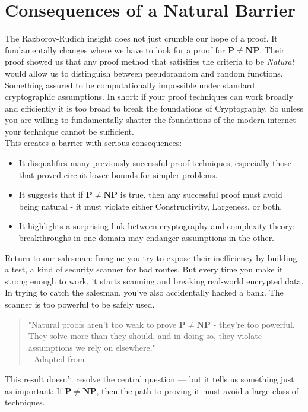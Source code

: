 \documentclass[12pt]{report}
\begin{document}
\section{Consequences of a Natural Barrier}
The Razborov-Rudich insight does not just crumble our hope of a proof.
It fundamentally changes where we have to look for a proof for $\mathbf{P \ne NP}$.
Their proof showed us that any proof method that satisifies the criteria to be \textit{Natural} would allow us to distinguish between pseudorandom and random functions.
Something assured to be computationally impossible under standard cryptographic assumptions.
In short: if your proof techniques can work broadly and efficiently it is too broad to break the foundations of Cryptography.
So unless you are willing to fundamentally shatter the foundations of the modern internet your technique cannot be sufficient.\\
This creates a barrier with serious consequences:
\begin{itemize}
    \item It disqualifies many previously successful proof techniques, especially those that proved circuit lower bounds for simpler problems.
    \item It suggests that if $\mathbf{P \ne NP}$ is true, then any successful proof must avoid being natural - it must violate either Constructivity, Largeness, or both.
    \item It highlights a surprising link between cryptography and complexity theory: breakthroughs in one domain may endanger assumptions in the other.
\end{itemize}
Return to our salesman:
Imagine you try to expose their inefficiency by building a test, a kind of security scanner for bad routes.
But every time you make it strong enough to work, it starts scanning and breaking real-world encrypted data.
In trying to catch the salesman, you've also accidentally hacked a bank.
The scanner is too powerful to be safely used.

\begin{quote}
    "Natural proofs aren't too weak to prove $\mathbf{P \ne NP}$ - they're too powerful.
    They solve more than they should, and in doing so, they violate assumptions we rely on elsewhere."\\
    - Adapted from \cite{razborov1994}
\end{quote}

This result doesn't resolve the central question --- but it tells us something just as important:
If $\mathbf{P \ne NP}$, then the path to proving it must avoid a large class of techniques.
\vspace{3cm}
\end{document}
